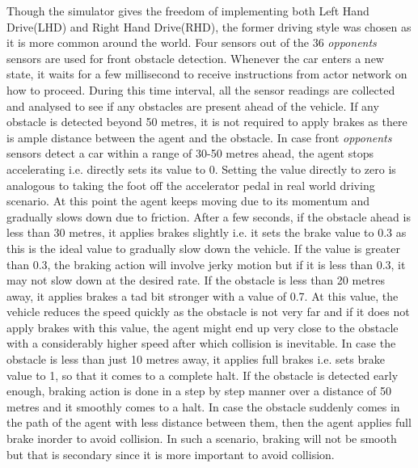 Though the simulator gives the freedom of implementing both Left Hand Drive(LHD) and Right Hand Drive(RHD), the former driving style was chosen as it is more common around the world. Four sensors out of the 36 \emph{opponents} sensors are used for front obstacle detection. 
Whenever the car enters a new state, it waits for a few millisecond to receive instructions from actor network on how to proceed. During this time interval, all the sensor readings are collected and analysed to see if any obstacles are present ahead of the vehicle. If any obstacle is detected beyond 50 metres, it is not required to apply brakes as there is ample distance between the agent and the obstacle. In case front \emph{opponents} sensors detect a car within a range of 30-50 metres ahead, the agent stops accelerating i.e. directly sets its value to 0. Setting the value directly to zero is analogous to taking the foot off the accelerator pedal in real world driving scenario. At this point the agent keeps moving due to its momentum and gradually slows down due to friction. After a few seconds, if the obstacle ahead is less than 30 metres, it applies brakes slightly i.e. it sets the brake value to 0.3 as this is the ideal value to gradually slow down the vehicle. If the value is greater than 0.3, the braking action will involve jerky motion but if it is less than 0.3, it may not slow down at the desired rate. If the obstacle is less than 20 metres away, it applies brakes a tad bit stronger with a value of 0.7. At this value, the vehicle reduces the speed quickly as the obstacle is not very far and if it does not apply brakes with this value, the agent might end up very close to the obstacle with a considerably higher speed after which collision is inevitable. In case the obstacle is less than just 10 metres away, it applies full brakes i.e. sets brake value to 1, so that it comes to a complete halt. 
If the obstacle is detected early enough, braking action is done in a step by step manner over a distance of 50 metres and it smoothly comes to a halt. 
In case the obstacle suddenly comes in the path of the agent with less distance between them, then the agent applies full brake inorder to avoid collision. In such a scenario, braking will not be smooth but that is secondary since it is more important to avoid collision. 

